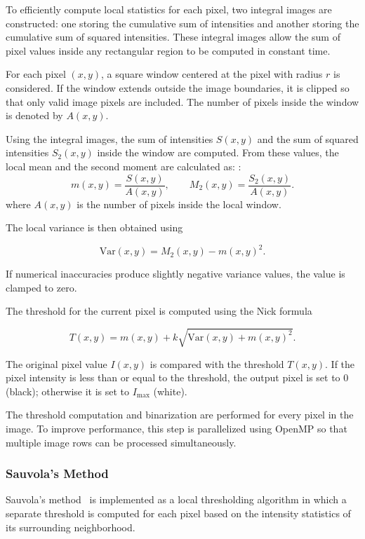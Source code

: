 To efficiently compute local statistics for each pixel, two integral
images are constructed: one storing the cumulative sum of intensities
and another storing the cumulative sum of squared intensities. These
integral images allow the sum of pixel values inside any rectangular
region to be computed in constant time.

For each pixel $(x,y)$, a square window centered at the pixel with
radius $r$ is considered. If the window extends outside the image
boundaries, it is clipped so that only valid image pixels are included.
The number of pixels inside the window is denoted by $A(x,y)$.

Using the integral images, the sum of intensities $S(x,y)$ and the sum
of squared intensities $S_2(x,y)$ inside the window are computed. From
these values, the local mean and the second moment are calculated as:
:
\[
m(x,y) = \frac{S(x,y)}{A(x,y)}, \qquad
M_2(x,y) = \frac{S_2(x,y)}{A(x,y)}.
\]
where $A(x,y)$ is the number of pixels inside the local window.

The local variance is then obtained using

\[
\mathrm{Var}(x,y) = M_2(x,y) - m(x,y)^2 .
\]

If numerical inaccuracies produce slightly negative variance values,
the value is clamped to zero.

The threshold for the current pixel is computed using the Nick formula

\[
T(x,y) = m(x,y) + k \sqrt{\mathrm{Var}(x,y) + m(x,y)^2}.
\]

The original pixel value $I(x,y)$ is compared with the threshold
$T(x,y)$. If the pixel intensity is less than or equal to the
threshold, the output pixel is set to $0$ (black); otherwise it is set
to $I_{\text{max}}$ (white).

The threshold computation and binarization are performed for every
pixel in the image. To improve performance, this step is parallelized
using OpenMP so that multiple image rows can be processed
simultaneously.


\subsubsection{Sauvola's Method}

Sauvola's method~\cite{Sauvola2000} is implemented as a local thresholding algorithm in
which a separate threshold is computed for each pixel based on the
intensity statistics of its surrounding neighborhood.

